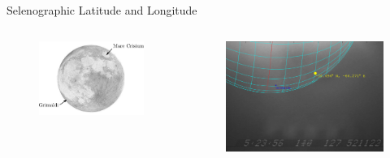 \documentclass[pdf]{beamer}
\begin{document}
 \begin{frame}{Selenographic Latitude and Longitude}
   \begin{columns}
	 \begin{figure}[ht!]
	   \centering
	   \includegraphics[width=\textwidth]{Images/reference_craters.pdf}
	 \end{figure}
	 \begin{figure}[ht!]
	   \centering
	   \includegraphics[width=\textwidth]{Images/coord_fits.png}
	 \end{figure}
   \end{columns}
 \end{frame}
\end{document}
